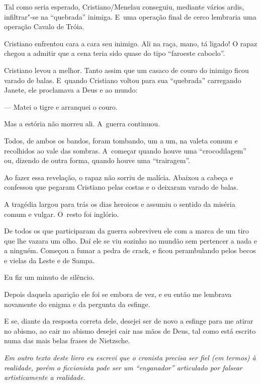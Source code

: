 Tal como seria esperado, Cristiano/Menelau conseguiu, mediante vários
ardis, infiltrar"-se na ``quebrada'' inimiga. E~uma operação final de
cerco lembraria uma operação Cavalo de Tróia.

Cristiano enfrentou cara a cara seu inimigo. Ali na raça, mano, tá
ligado! O rapaz chegou a admitir que a cena teria sido quase do tipo
``faroeste caboclo''.

Cristiano levou a melhor. Tanto assim que um casaco de couro do inimigo
ficou varado de balas. E~quando Cristiano voltou para sua ``quebrada''
carregando Janete, ele proclamava a Deus e ao mundo:

— Matei o tigre e arranquei o couro.

Mas a estória não morreu ali. A~guerra continuou.

Todos, de ambos os bandos, foram tombando, um a um, na valeta comum e
recolhidos ao vale das sombras. A~começar quando houve uma
``crocodilagem'' ou, dizendo de outra forma, quando houve uma
``trairagem''.

Ao fazer essa revelação, o rapaz não sorriu de malícia. Abaixou a cabeça
e confessou que pegaram Cristiano pelas costas e o deixaram varado de
balas.

A tragédia largou para trás os dias heroicos e assumiu o sentido da
miséria comum e vulgar. O~resto foi inglório.

De todos os que participaram da guerra sobreviveu ele com a marca de um
tiro que lhe vazara um olho. Daí ele se viu sozinho no mundão sem
pertencer a nada e a ninguém. Começou a fumar a pedra de crack, e ficou
perambulando pelos becos e vielas da Leste e de Sampa.

Eu fiz um minuto de silêncio.

\asterisc{}

Depois daquela aparição ele foi se embora de vez, e eu então me lembrava
novamente do enigma e da pergunta da esfinge.

E se, diante da resposta correta dele, desejei ser de novo a esfinge
para me atirar no abismo, ao cair no abismo desejei cair nas mãos de
Deus, tal como está escrito numa das mais belas frases de Nietzsche.~

\begin{center}\asterisc{}\end{center}


\emph{Em outro texto deste livro eu escrevi que o cronista precisa ser
fiel (em termos) à realidade, porém o ficcionista pode ser um
``enganador'' articulado por falsear artisticamente a realidade.}~

